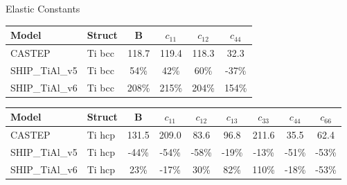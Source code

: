 \documentclass[preview]{standalone}
\begin{document}
\begin{center}
\textnormal{Elastic Constants} \\
\vspace{2mm}
\begin{tabular}{ l l c c c c } \toprule 
Model & Struct & B & $c_{11}$ & $c_{12}$ & $c_{44}$\\ \midrule 
CASTEP & Ti bcc & 118.7 & 119.4 & 118.3 & 32.3\\ 
SHIP\_TiAl\_v5 & Ti bcc & 54\% & 42\% & 60\% & -37\%\\ 
SHIP\_TiAl\_v6 & Ti bcc & 208\% & 215\% & 204\% & 154\%\\ 
\end{tabular} \bigskip \begin{tabular}{ l l c c c c c c c } \toprule 
Model & Struct & B & $c_{11}$ & $c_{12}$ & $c_{13}$ & $c_{33}$ & $c_{44}$ & $c_{66}$\\ \midrule 
CASTEP & Ti hcp & 131.5 & 209.0 & 83.6 & 96.8 & 211.6 & 35.5 & 62.4\\ 
SHIP\_TiAl\_v5 & Ti hcp & -44\% & -54\% & -58\% & -19\% & -13\% & -51\% & -53\%\\ 
SHIP\_TiAl\_v6 & Ti hcp & 23\% & -17\% & 30\% & 82\% & 110\% & -18\% & -53\%\\ 
\end{tabular} \bigskip 
\end{center}
\end{document}
